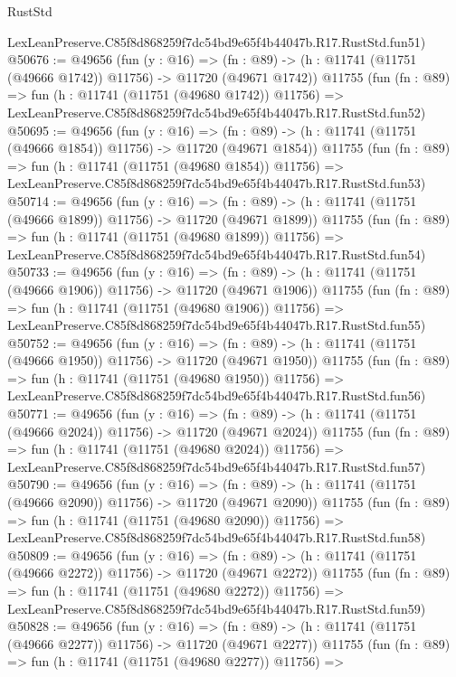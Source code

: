 \begin{lexlean}{RustStd}
\begin{coremodule}
    LexLeanPreserve.C85f8d868259f7dc54bd9e65f4b44047b.R17.RustStd.fun51)
@50676 := @49656
    (fun (y : @16) =>
    (fn : @89) -> (h : @11741 (@11751 (@49666 @1742)) @11756) -> @11720 (@49671 @1742))
    @11755
    (fun (fn : @89) =>
    fun (h : @11741 (@11751 (@49680 @1742)) @11756) =>
    LexLeanPreserve.C85f8d868259f7dc54bd9e65f4b44047b.R17.RustStd.fun52)
@50695 := @49656
    (fun (y : @16) =>
    (fn : @89) -> (h : @11741 (@11751 (@49666 @1854)) @11756) -> @11720 (@49671 @1854))
    @11755
    (fun (fn : @89) =>
    fun (h : @11741 (@11751 (@49680 @1854)) @11756) =>
    LexLeanPreserve.C85f8d868259f7dc54bd9e65f4b44047b.R17.RustStd.fun53)
@50714 := @49656
    (fun (y : @16) =>
    (fn : @89) -> (h : @11741 (@11751 (@49666 @1899)) @11756) -> @11720 (@49671 @1899))
    @11755
    (fun (fn : @89) =>
    fun (h : @11741 (@11751 (@49680 @1899)) @11756) =>
    LexLeanPreserve.C85f8d868259f7dc54bd9e65f4b44047b.R17.RustStd.fun54)
@50733 := @49656
    (fun (y : @16) =>
    (fn : @89) -> (h : @11741 (@11751 (@49666 @1906)) @11756) -> @11720 (@49671 @1906))
    @11755
    (fun (fn : @89) =>
    fun (h : @11741 (@11751 (@49680 @1906)) @11756) =>
    LexLeanPreserve.C85f8d868259f7dc54bd9e65f4b44047b.R17.RustStd.fun55)
@50752 := @49656
    (fun (y : @16) =>
    (fn : @89) -> (h : @11741 (@11751 (@49666 @1950)) @11756) -> @11720 (@49671 @1950))
    @11755
    (fun (fn : @89) =>
    fun (h : @11741 (@11751 (@49680 @1950)) @11756) =>
    LexLeanPreserve.C85f8d868259f7dc54bd9e65f4b44047b.R17.RustStd.fun56)
@50771 := @49656
    (fun (y : @16) =>
    (fn : @89) -> (h : @11741 (@11751 (@49666 @2024)) @11756) -> @11720 (@49671 @2024))
    @11755
    (fun (fn : @89) =>
    fun (h : @11741 (@11751 (@49680 @2024)) @11756) =>
    LexLeanPreserve.C85f8d868259f7dc54bd9e65f4b44047b.R17.RustStd.fun57)
@50790 := @49656
    (fun (y : @16) =>
    (fn : @89) -> (h : @11741 (@11751 (@49666 @2090)) @11756) -> @11720 (@49671 @2090))
    @11755
    (fun (fn : @89) =>
    fun (h : @11741 (@11751 (@49680 @2090)) @11756) =>
    LexLeanPreserve.C85f8d868259f7dc54bd9e65f4b44047b.R17.RustStd.fun58)
@50809 := @49656
    (fun (y : @16) =>
    (fn : @89) -> (h : @11741 (@11751 (@49666 @2272)) @11756) -> @11720 (@49671 @2272))
    @11755
    (fun (fn : @89) =>
    fun (h : @11741 (@11751 (@49680 @2272)) @11756) =>
    LexLeanPreserve.C85f8d868259f7dc54bd9e65f4b44047b.R17.RustStd.fun59)
@50828 := @49656
    (fun (y : @16) =>
    (fn : @89) -> (h : @11741 (@11751 (@49666 @2277)) @11756) -> @11720 (@49671 @2277))
    @11755
    (fun (fn : @89) =>
    fun (h : @11741 (@11751 (@49680 @2277)) @11756) =>

\end{coremodule}
\end{lexlean}
